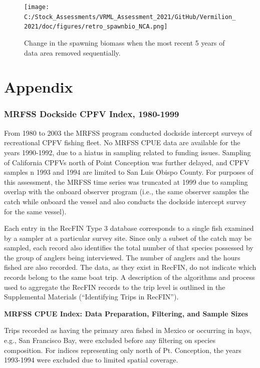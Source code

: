 \documentclass[
  english,
  a4paper,
]{article}
\begin{document}
\begin{figure}
\centering
\texttt{[image: C:/Stock\_Assessments/VRML\_Assessment\_2021/GitHub/Vermilion\_2021/doc/figures/retro\_spawnbio\_NCA.png]}
\caption{Change in the spawning biomass when the most recent 5 years of data area removed sequentially.\label{fig:retro-spawnb}}
\end{figure}

\clearpage

\hypertarget{appendix}{%
\section{Appendix}\label{appendix}}

\hypertarget{mrfss-dockside-cpfv-index-1980-1999}{%
\subsubsection{MRFSS Dockside CPFV Index, 1980-1999}\label{mrfss-dockside-cpfv-index-1980-1999}}

From 1980 to 2003 the MRFSS program conducted dockside intercept surveys of
recreational CPFV fishing fleet. No MRFSS CPUE data are available for the years
1990-1992, due to a hiatus in sampling related to funding issues. Sampling of
California CPFVs north of Point Conception was further delayed, and CPFV samples
n 1993 and 1994 are limited to San Luis Obispo County.
For purposes of this assessment, the MRFSS time series was truncated at 1999 due
to sampling overlap with the
onboard observer program (i.e., the same observer samples the catch while
onboard the vessel and also conducts the dockside intercept survey for
the same vessel).

Each entry in the RecFIN Type 3 database corresponds to a
single fish examined by a sampler at a particular survey site. Since only a
subset of the catch may be sampled, each record also
identifies the total number of that species possessed by the group of anglers
being interviewed. The number of anglers and the hours fished are also recorded.
The data, as they exist in RecFIN, do not indicate which records
belong to the same boat trip. A description of the algorithms and process used to
aggregate the RecFIN records to the trip level is outlined in the Supplemental Materials
(``Identifying Trips in RecFIN'').

\textbf{MRFSS CPUE Index: Data Preparation, Filtering, and Sample Sizes}

Trips recorded as having the primary area fished in Mexico or occurring in bays, e.g.,
San Francisco Bay, were excluded before any filtering on species composition.
For indices representing only north of Pt. Conception, the years 1993-1994 were
excluded due to limited spatial coverage.
\end{document}

